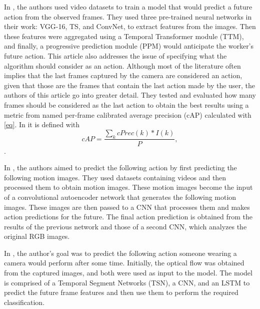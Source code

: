 \documentclass[conference]{IEEEtran}
\begin{document}
In \textcite{Wang2021}, the authors used video datasets to train a model that would predict a future action from the observed frames. They used three pre-trained neural networks in their work: VGG-16, TS, and ConvNet, to extract features from the images. Then these features were aggregated using a Temporal Transformer module (TTM), and finally, a progressive prediction module (PPM) would anticipate the worker’s future action. This article also addresses the issue of specifying what the algorithm should consider as an action. Although most of the literature often implies that the last frames captured by the camera are considered an action, given that those are the frames that contain the last action made by the user, the authors of this article go into greater detail. They tested and evaluated how many frames should be considered as the last action to obtain the best results using a metric from \textcite{Geest2016} named per-frame calibrated average precision (cAP) calculated with \eqref{eq}. In \cite{Wang2021} it is defined with
\begin{equation}
cAP=\frac{\sum_k cPrec(k) * I(k)}{P},
\label{eq}
\end{equation}
.

In \textcite{Rodriguez2019}, the authors aimed to predict the following action by first predicting the following motion images. They used datasets containing videos and then processed them to obtain motion images. These motion images become the input of a convolutional autoencoder network that generates the following motion images. These images are then passed to a CNN that processes them and makes action predictions for the future. The final action prediction is obtained from the results of the previous network and those of a second CNN, which analyzes the original RGB images.

In \textcite{Wu2021}, the author’s goal was to predict the following action someone wearing a camera would perform after some time. Initially, the optical flow was obtained from the captured images, and both were used as input to the model. The model is comprised of a Temporal Segment Networks (TSN), a CNN, and an LSTM to predict the future frame features and then use them to perform the required classification.
\end{document}

